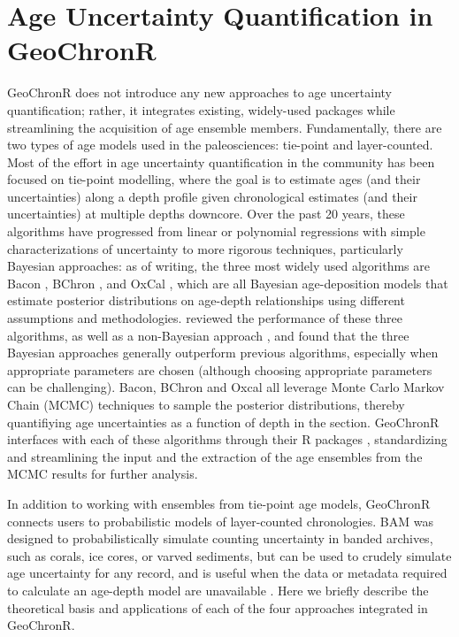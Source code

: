 \documentclass[gchron, manuscript]{copernicus}
\begin{document}
\hypertarget{sec:age-modeling}{%
\section{Age Uncertainty Quantification in GeoChronR}\label{sec:age-modeling}}

GeoChronR does not introduce any new approaches to age uncertainty quantification; rather, it integrates existing, widely-used packages while streamlining the acquisition of age ensemble members.
Fundamentally, there are two types of age models used in the paleosciences: tie-point and layer-counted.
Most of the effort in age uncertainty quantification in the community has been focused on tie-point modelling, where the goal is to estimate ages (and their uncertainties) along a depth profile given chronological estimates (and their uncertainties) at multiple depths downcore.
Over the past 20 years, these algorithms have progressed from linear or polynomial regressions with simple characterizations of uncertainty \citep{Heegaard2005, Blaauw2010CLAM} to more rigorous techniques, particularly Bayesian approaches: as of writing, the three most widely used algorithms are Bacon \citep{bacon}, BChron \citep{parnell2008flexible}, and OxCal \citep{ramsey2008deposition}, which are all Bayesian age-deposition models that estimate posterior distributions on age-depth relationships using different assumptions and methodologies.
\citet{trachsel2017} reviewed the performance of these three algorithms, as well as a non-Bayesian approach \citep{Blaauw2010CLAM}, and found that the three Bayesian approaches generally outperform previous algorithms, especially when appropriate parameters are chosen (although choosing appropriate parameters can be challenging).
Bacon, BChron and Oxcal all leverage Monte Carlo Markov Chain (MCMC) techniques to sample the posterior distributions, thereby quantifiying age uncertainties as a function of depth in the section.
GeoChronR interfaces with each of these algorithms through their R packages \citetext{\citealp[\citet{baconPackage}]{parnell2008flexible}; \citealp{oxcAAR}}, standardizing and streamlining the input and the extraction of the age ensembles from the MCMC results for further analysis.

In addition to working with ensembles from tie-point age models, GeoChronR connects users to probabilistic models of layer-counted chronologies.
BAM \citep{BAM} was designed to probabilistically simulate counting uncertainty in banded archives, such as corals, ice cores, or varved sediments, but can be used to crudely simulate age uncertainty for any record, and is useful when the data or metadata required to calculate an age-depth model are unavailable \citep[e.g.][]{kaufman2020HoloceneGMST}.
Here we briefly describe the theoretical basis and applications of each of the four approaches integrated in GeoChronR.
\end{document}
